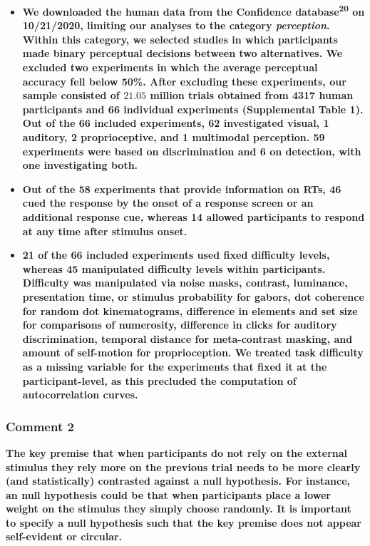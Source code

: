 \documentclass[
]{article}
\begin{document}
\begin{itemize}
\item
  \textbf{We downloaded the human data from the Confidence
  database\textsuperscript{20} on 10/21/2020, limiting our analyses to
  the category \emph{perception}. Within this category, we selected
  studies in which participants made binary perceptual decisions between
  two alternatives. We excluded two experiments in which the average
  perceptual accuracy fell below 50\%. After excluding these
  experiments, our sample consisted of \(21.05\) million trials obtained
  from 4317 human participants and 66 individual experiments
  (Supplemental Table 1). Out of the 66 included experiments, 62
  investigated visual, 1 auditory, 2 proprioceptive, and 1 multimodal
  perception. 59 experiments were based on discrimination and 6 on
  detection, with one investigating both.}
\item
  \textbf{Out of the 58 experiments that provide information on RTs, 46
  cued the response by the onset of a response screen or an additional
  response cue, whereas 14 allowed participants to respond at any time
  after stimulus onset.}
\item
  \textbf{21 of the 66 included experiments used fixed difficulty
  levels, whereas 45 manipulated difficulty levels within participants.
  Difficulty was manipulated via noise masks, contrast, luminance,
  presentation time, or stimulus probability for gabors, dot coherence
  for random dot kinematograms, difference in elements and set size for
  comparisons of numerosity, difference in clicks for auditory
  discrimination, temporal distance for meta-contrast masking, and
  amount of self-motion for proprioception. We treated task difficulty
  as a missing variable for the experiments that fixed it at the
  participant-level, as this precluded the computation of
  autocorrelation curves.}
\end{itemize}

\hypertarget{comment-2-1}{%
\subsubsection{Comment 2}\label{comment-2-1}}

\textbf{The key premise that when participants do not rely on the
external stimulus they rely more on the previous trial needs to be more
clearly (and statistically) contrasted against a null hypothesis. For
instance, an null hypothesis could be that when participants place a
lower weight on the stimulus they simply choose randomly. It is
important to specify a null hypothesis such that the key premise does
not appear self-evident or circular.}
\end{document}
